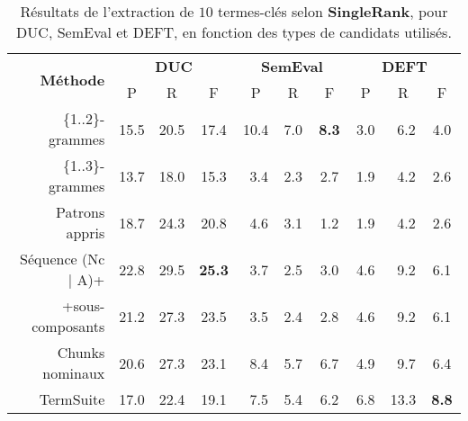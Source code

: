     \begin{table}
      \centering
      \begin{tabular}{@{~~}rc@{~~~}c@{~~~}cc@{~~~}c@{~~~}cc@{~~~}c@{~~~}c@{~~}}
        \toprule
        \multirow{2}{*}[-2pt]{\textbf{Méthode}} & \multicolumn{3}{c}{\textbf{DUC}} & \multicolumn{3}{c}{\textbf{SemEval}} & \multicolumn{3}{c}{\textbf{DEFT}}\\
        \cmidrule(r){2-4}\cmidrule(lr){5-7}\cmidrule(l){8-10}
        & P & R & F & P & R & F & P & R & F\\
        \midrule
        \{1..2\}-grammes & 15.5 & 20.5 & 17.4 & 10.4 & $~~$7.0 & \textbf{$~~$8.3} & $~~$3.0 & $~~$6.2 & $~~$4.0\\
        \{1..3\}-grammes & 13.7 & 18.0 & 15.3 & $~~$3.4 & $~~$2.3 & $~~$2.7 & $~~$1.9 & $~~$4.2 & $~~$2.6\\
        Patrons appris & 18.7 & 24.3 & 20.8 & $~~$4.6 & $~~$3.1 & $~~$1.2 & $~~$1.9 & $~~$4.2 & $~~$2.6\\
        Séquence (Nc | A)+ & 22.8 & 29.5 & \textbf{25.3} & $~~$3.7 & $~~$2.5 & $~~$3.0 & $~~$4.6 & $~~$9.2 & $~~$6.1\\
        +sous-composants & 21.2 & 27.3 & 23.5 & $~~$3.5 & $~~$2.4 & $~~$2.8 & $~~$4.6 & $~~$9.2 & $~~$6.1\\
        Chunks nominaux & 20.6 & 27.3 & 23.1 & $~~$8.4 & $~~$5.7 & $~~$6.7 & $~~$4.9 & $~~$9.7 & $~~$6.4\\
        TermSuite & 17.0 & 22.4 & 19.1 & $~~$7.5 & $~~$5.4 & $~~$6.2 & $~~$6.8 & 13.3 & \textbf{$~~$8.8}\\
        \bottomrule
      \end{tabular}
      \caption{Résultats de l'extraction de $10$ termes-clés selon
               \textbf{SingleRank}, pour DUC, SemEval et DEFT, en fonction des
               types de candidats utilisés. 
               \label{tab:resultats_de_singlerank}}
    \end{table}

